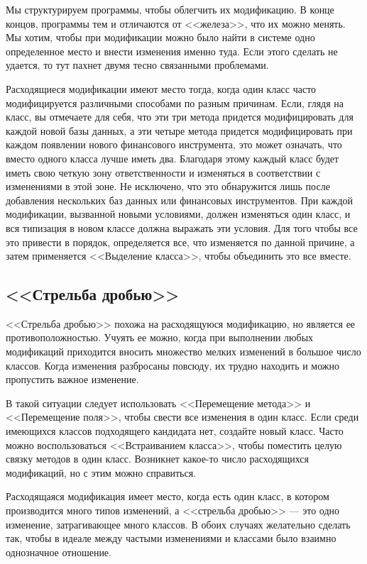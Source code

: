 \documentclass{../../text-style}
\begin{document}
Мы структурируем программы, чтобы облегчить их модификацию. В конце концов, программы тем и отличаются от <<железа>>, что их можно менять. Мы хотим, чтобы при модификации можно было найти в системе одно определенное место и внести изменения именно туда. Если этого сделать не удается, то тут пахнет двумя тесно связанными проблемами.

Расходящиеся модификации имеют место тогда, когда один класс часто модифицируется различными способами по разным причинам. Если, глядя на класс, вы отмечаете для себя, что эти три метода придется модифицировать для каждой новой базы данных, а эти четыре метода придется модифицировать при каждом появлении нового финансового инструмента, это может означать, что вместо одного класса лучше иметь два. Благодаря этому каждый класс будет иметь свою четкую зону ответственности и изменяться в соответствии с изменениями в этой зоне. Не исключено, что это обнаружится лишь после добавления нескольких баз данных или финансовых инструментов. При каждой модификации, вызванной новыми условиями, должен изменяться один класс, и вся типизация в новом классе должна выражать эти условия. Для того чтобы все это привести в порядок, определяется все, что изменяется по данной причине, а затем применяется <<Выделение класса>>, чтобы объединить это все вместе.

\subsection{<<Стрельба дробью>>}

<<Стрельба дробью>> похожа на расходящуюся модификацию, но является ее противоположностью. Учуять ее можно, когда при выполнении любых модификаций приходится вносить множество мелких изменений в большое число классов. Когда изменения разбросаны повсюду, их трудно находить и можно пропустить важное изменение.

В такой ситуации следует использовать <<Перемещение метода>> и <<Перемещение поля>>, чтобы свести все изменения в один класс. Если среди имеющихся классов подходящего кандидата нет, создайте новый класс. Часто можно воспользоваться <<Встраиванием класса>>, чтобы поместить целую связку методов в один класс. Возникнет какое-то число расходящихся модификаций, но с этим можно справиться.

Расходящаяся модификация имеет место, когда есть один класс, в котором производится много типов изменений, а <<стрельба дробью>> --- это одно изменение, затрагивающее много классов. В обоих случаях желательно сделать так, чтобы в идеале между частыми изменениями и классами было взаимно однозначное отношение.
\end{document}
